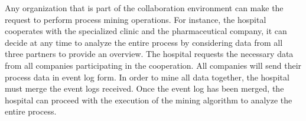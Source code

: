 Any organization that is part of the collaboration environment can make the request to perform process mining operations. For instance, the hospital cooperates with the specialized clinic and the pharmaceutical company, it can decide at any time to analyze the entire process by considering data from all three partners to provide an overview. The hospital requests the necessary data from all companies participating in the cooperation. All companies will send their process data in event log form. In order to mine all data together, the hospital must merge the event logs received. Once the event log has been merged, the hospital can proceed with the execution of the mining algorithm to analyze the entire process.

